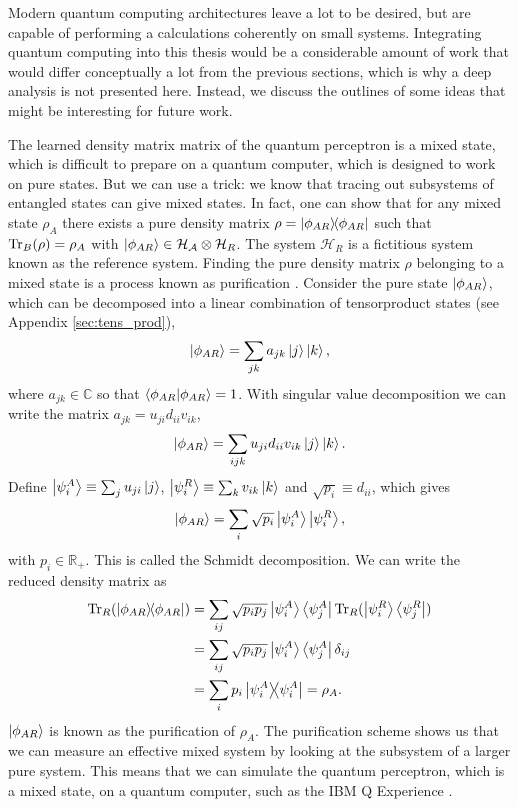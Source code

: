 Modern quantum computing architectures leave a lot to be desired, but are capable of performing a calculations coherently on small systems. Integrating quantum computing into this thesis would be a considerable amount of work that would differ conceptually a lot from the previous sections, which is why a deep analysis is not presented here. Instead, we discuss the outlines of some ideas that might be interesting for future work.\newline

\noindent The learned density matrix matrix of the quantum perceptron is a mixed state, which is difficult to prepare on a quantum computer, which is designed to work on pure states. But we can use a trick: we know that tracing out subsystems of entangled states can give mixed states. In fact, one can show that for any mixed state $\rho_A$ there exists a pure density matrix $\rho = \ketbra{\phi_{AR}}{\phi_{AR}}$ such that $\Tr_B (\rho) = \rho_A$ with $\ket{\phi_{AR}} \in \mathcal{H_A}\otimes\mathcal{H}_R$. The system $\mathcal{H}_R$ is a fictitious system known as the reference system. Finding the pure density matrix $\rho$ belonging to a mixed state is a process known as purification \cite{Nielsen2011}. Consider the pure state $\ket{\phi_{AR}}$, which can be decomposed into a linear combination of tensorproduct states (see Appendix \ref{sec:tens_prod}),
\begin{equation}
    \ket{\phi_{AR}} = \sum_{jk} a_{jk} \ket{j}\ket{k} 
    \label{eq:phi_general},
\end{equation}
where $a_{jk}\in \mathbb{C}$ so that $\braket{\phi_{AR}}{\phi_{AR}}=1$. With singular value decomposition we can write the matrix $a_{jk} = u_{ji}d_{ii}v_{ik}$,
\begin{equation*}
    \ket{\phi_{AR}} = \sum_{ijk} u_{ji}d_{ii}v_{ik} \ket{j}\ket{k}.
\end{equation*}
Define $ \ket{\psi^A_i} \equiv \sum_j u_{ji} \ket{j}$, $ \ket{\psi^R_i} \equiv \sum_k v_{ik} \ket{k}$ and $\sqrt{p_i} \equiv d_{ii}$, which gives
\begin{equation*}
    \ket{\phi_{AR}} = \sum_i \sqrt{p_i} \ket{\psi^A_i}\ket{\psi^R_i},
\end{equation*}
with $p_i\in \mathbb{R}_+$. This is called the Schmidt decomposition. We can write the reduced density matrix as
\begin{align*}
    \Tr_R(\ketbra{\phi_{AR}}{\phi_{AR}}) &= \sum_{ij} \sqrt{p_i p_j} \ket{\psi^A_i}\bra{\psi^A_j} \Tr_R(\ket{\psi^R_i}\bra{\psi^R_j})\\
    &= \sum_{ij} \sqrt{p_i p_j} \ket{\psi^A_i}\bra{\psi^A_j}\delta_{ij}\\
    &= \sum_i p_i \ketbra{\psi^A_i}{\psi^A_i} = \rho_A.
\end{align*}
$\ket{\phi_{AR}}$ is known as the purification of $\rho_A$. The purification scheme shows us that we can measure an effective mixed system by looking at the subsystem of a larger pure system. This means that we can simulate the quantum perceptron, which is a mixed state, on a quantum computer, such as the IBM Q Experience \cite{Qiskit}.\newline

